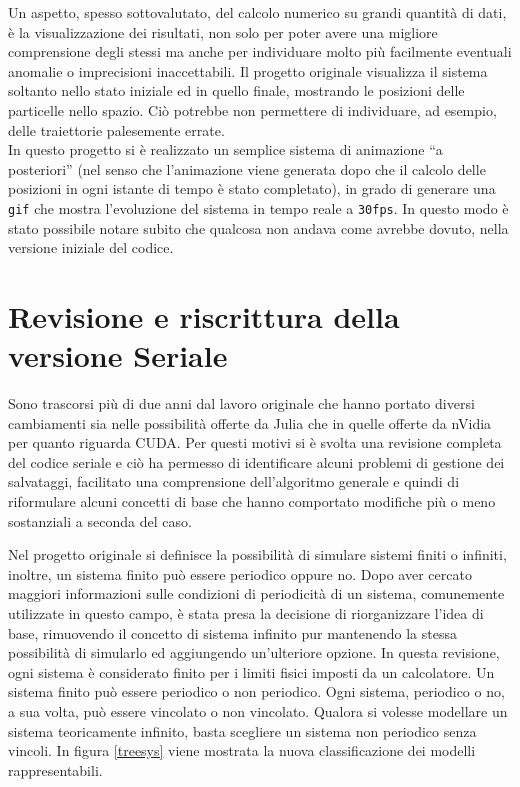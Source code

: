 \documentclass[11pt, a4paper]{article}
\begin{document}
Un aspetto, spesso sottovalutato, del calcolo numerico su grandi quantità di dati, è la visualizzazione dei risultati, non solo per poter avere una migliore comprensione degli stessi ma anche per individuare molto più facilmente eventuali anomalie o imprecisioni inaccettabili. Il progetto originale visualizza il sistema soltanto nello stato iniziale ed in quello finale, mostrando le posizioni delle particelle nello spazio. Ciò potrebbe non permettere di individuare, ad esempio, delle traiettorie palesemente errate.\\
In questo progetto si è realizzato un semplice sistema di animazione ``a posteriori'' (nel senso che l'animazione viene generata dopo che il calcolo delle posizioni in ogni istante di tempo è stato completato), in grado di generare una \texttt{gif} che mostra l'evoluzione del sistema in tempo reale a \texttt{30fps}. In questo modo è stato possibile notare subito che qualcosa non andava come avrebbe dovuto, nella versione iniziale del codice.

\section{Revisione e riscrittura della versione Seriale}
Sono trascorsi più di due anni dal lavoro originale che hanno portato diversi cambiamenti sia nelle possibilità offerte da Julia che in quelle offerte da nVidia per quanto riguarda CUDA. 
Per questi motivi si è svolta una revisione completa del codice seriale e ciò ha permesso di identificare alcuni problemi di gestione dei salvataggi, facilitato una comprensione dell'algoritmo generale e quindi di riformulare alcuni concetti di base che hanno comportato modifiche più o meno sostanziali a seconda del caso.

Nel progetto originale si definisce la possibilità di simulare sistemi finiti o infiniti, inoltre, un sistema finito può essere periodico oppure no. Dopo aver cercato maggiori informazioni sulle condizioni di periodicità di un sistema, comunemente utilizzate in questo campo, è stata presa la decisione di riorganizzare l'idea di base, rimuovendo il concetto di sistema infinito pur mantenendo la stessa possibilità di simularlo ed aggiungendo un'ulteriore opzione. In questa revisione, ogni sistema è considerato finito per i limiti fisici imposti da un calcolatore. Un sistema finito può essere periodico o non periodico. Ogni sistema, periodico o no, a sua volta, può essere vincolato o non vincolato. Qualora si volesse modellare un sistema teoricamente infinito, basta scegliere un sistema non periodico senza vincoli. In figura \ref{treesys} viene mostrata la nuova classificazione dei modelli rappresentabili.
\end{document}
